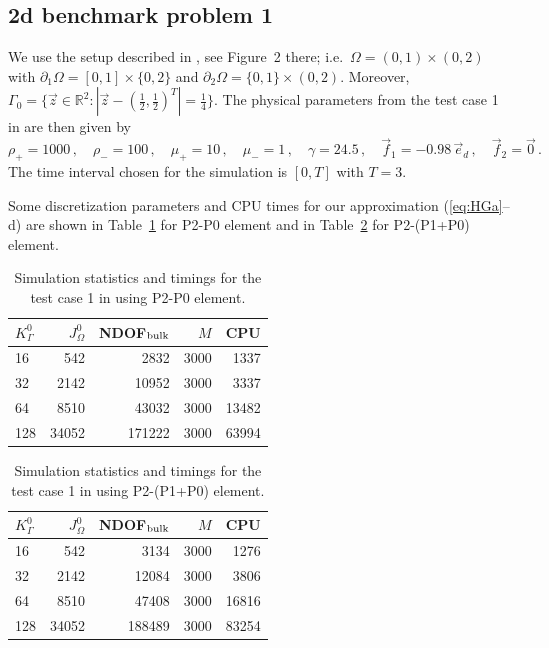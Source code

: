 \documentclass[a4paper,12pt,onecolumn]{article}
\newcommand{\R}{{\mathbb R}}
\newcommand{\ek}{e}
\begin{document}
\subsection{2d benchmark problem 1} \label{sec:2d_benchmark_1}
We use the setup described in \cite{HysingTKPBGT09}, see Figure~2 there;
i.e.\ $\Omega = (0,1) \times (0,2)$ with
$\partial_1\Omega = [0,1] \times \{0,2\}$ and
$\partial_2\Omega = \{0,1\} \times (0,2)$.
Moreover, $\Gamma_0 = \{\vec z \in \R^2 : |\vec z - (\frac12, \frac12)^T| =
\frac14\}$.
The physical parameters from the test case 1 in \cite[Table~I]{HysingTKPBGT09}
are then given by
\begin{equation} \label{eq:Hysing1}
\rho_+ = 1000\,,\quad \rho_- = 100\,,\quad \mu_+ = 10\,,\quad \mu_- = 1\,,\quad
\gamma = 24.5\,,\quad \vec f_1 = -0.98\,\vec\ek_d\,,\quad \vec f_2 = \vec 0\,.
\end{equation}
The time interval chosen for the simulation is $[0,T]$ with $T=3$.

Some discretization parameters and CPU times for our approximation
(\ref{eq:HGa}--d) are shown in Table~\ref{tab:2d_CPU_P0} for P2-P0 element and
in Table~\ref{tab:2d_CPU_P1P0} for P2-(P1+P0) element.
\begin{table}
\center
\begin{tabular}{lrrrr}
\hline
$K^0_\Gamma$ & $J^0_\Omega$ & NDOF$_{\rm bulk}$ & $M$ & CPU \\
\hline
16 & 542 & 2832 & 3000 & 1337 \\
32 & 2142 & 10952 & 3000 & 3337 \\
64 & 8510 & 43032 & 3000 & 13482 \\
128 & 34052 & 171222 & 3000 & 63994 \\
\hline
\end{tabular}
\caption{Simulation statistics and timings for the test case 1 in
\cite{HysingTKPBGT09} using P2-P0 element.}
\label{tab:2d_CPU_P0}
\end{table}

\begin{table}
\center
\begin{tabular}{lrrrr}
\hline
$K^0_\Gamma$ & $J^0_\Omega$ & NDOF$_{\rm bulk}$ & $M$ & CPU \\
\hline
16 & 542 & 3134 & 3000 & 1276 \\
32 & 2142 & 12084 & 3000 & 3806 \\
64 & 8510 & 47408 & 3000 & 16816 \\
128 & 34052 & 188489 & 3000 & 83254 \\
\hline
\end{tabular}
\caption{Simulation statistics and timings for the test case 1 in
\cite{HysingTKPBGT09} using P2-(P1+P0) element.}
\label{tab:2d_CPU_P1P0}
\end{table}
\end{document}
